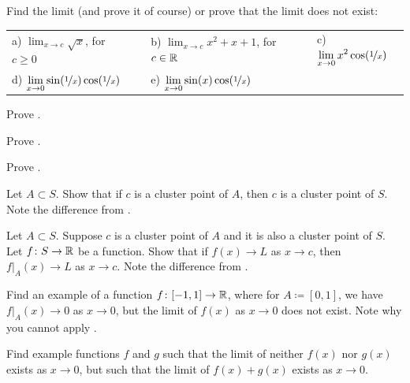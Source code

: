 \begin{exercise}
Find the limit (and prove it of course) or prove that the limit does not
exist:

\medskip

\noindent
\begin{tabular}{lllll}
a)
$\displaystyle
\lim_{x\to c} \sqrt{x}
$, for $c \geq 0$
& &
b)
$\displaystyle
\lim_{x\to c} x^2+x+1
$, for $c \in {\mathbb{R}}$
& &
c)
$\displaystyle
\lim_{x\to 0} x^2 \cos (\nicefrac{1}{x})
$
\\
d)
$\displaystyle
\lim_{x\to 0} \sin(\nicefrac{1}{x}) \cos (\nicefrac{1}{x})
$
& &
e)
$\displaystyle
\lim_{x\to 0} \sin(x) \cos (\nicefrac{1}{x})
$ & 
\end{tabular}
\end{exercise}

\begin{exercise}
Prove .
\end{exercise}

\begin{exercise}
Prove .
\end{exercise}

\begin{exercise}
Prove .
\end{exercise}

\begin{exercise}
Let $A \subset S$.  Show that if $c$ is a cluster point of $A$, then $c$
is a cluster point of $S$.  Note the difference from
.
\end{exercise}

\begin{exercise} \label{exercise:restrictionlimitexercise}
Let $A \subset S$.  Suppose $c$ is a cluster point of $A$ and
it is also a cluster point of $S$.
Let $f \colon S \to {\mathbb{R}}$ be a function.  Show that if
$f(x) \to L$ as $x \to c$, then
$f|_A(x) \to L$ as $x \to c$.
Note the difference from
.
\end{exercise}

\begin{exercise}
Find an example of a function $f \colon [-1,1] \to {\mathbb{R}}$, where for
$A\coloneqq [0,1]$, we have
$f|_A(x) \to 0$ as $x \to 0$, but the limit of $f(x)$ as $x \to 0$
does not exist.  Note why you cannot apply
.
\end{exercise}

\begin{exercise}
Find example functions $f$ and $g$ such that the limit of neither $f(x)$
nor $g(x)$ exists as $x \to 0$, but such that the limit of $f(x)+g(x)$ exists
as $x \to 0$.
\end{exercise}

